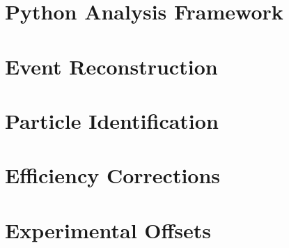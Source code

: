 \label{Chapter-6}

\hypertarget{Section-6.1}{%
\section{Python Analysis Framework}\label{Section-6.1}}

\hypertarget{Section-6.2}{%
\section{Event Reconstruction}\label{Section-6.2}}

\hypertarget{Section-6.3}{%
\section{Particle Identification}\label{Section-6.3}}

\hypertarget{Section-6.4}{%
\section{Efficiency Corrections}\label{Section-6.4}}

\hypertarget{Section-6.5}{%
\section{Experimental Offsets}\label{Section-6.5}}


